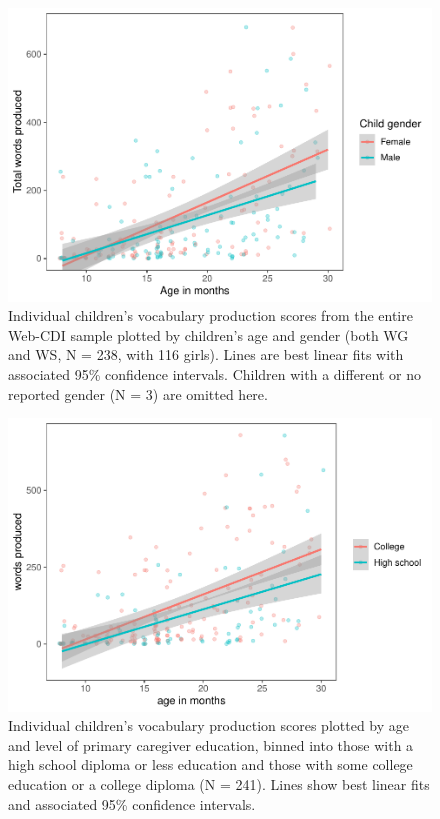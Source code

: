 \documentclass[
  english,
  ,man,floatsintext]{apa6}
\begin{document}
\begin{figure}
\centering
\includegraphics{webcdi_paper_files/figure-latex/genderses-1.pdf}
\caption{\label{fig:genderses}Individual children's vocabulary production scores from the entire Web-CDI sample plotted by children's age and gender (both WG and WS, N = 238, with 116 girls). Lines are best linear fits with associated 95\% confidence intervals. Children with a different or no reported gender (N = 3) are omitted here.}
\end{figure}

\begin{figure}
\centering
\includegraphics{webcdi_paper_files/figure-latex/momedses-1.pdf}
\caption{\label{fig:momedses}Individual children's vocabulary production scores plotted by age and level of primary caregiver education, binned into those with a high school diploma or less education and those with some college education or a college diploma (N = 241). Lines show best linear fits and associated 95\% confidence intervals.}
\end{figure}
\end{document}
